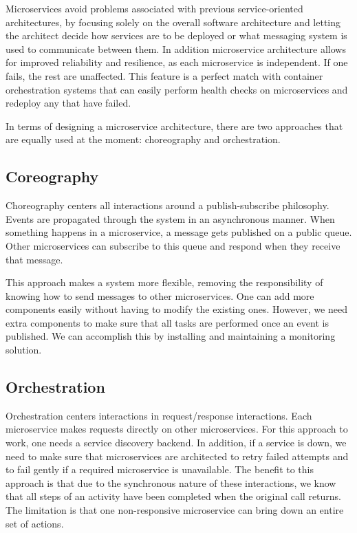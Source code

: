 Microservices avoid problems associated with previous service-oriented architectures, by focusing solely on the overall software architecture and letting the architect decide how services are to be deployed or what messaging system is used to communicate between them. In addition microservice architecture allows for improved reliability and resilience, as each microservice is independent. If one fails, the rest are unaffected. This feature is a perfect match with container orchestration systems that can easily perform health checks on microservices and redeploy any that have failed.

In terms of designing a microservice architecture, there are two approaches that are equally used at the moment: choreography and orchestration.\parencite{microservices}


\subsection{Coreography}

Choreography centers all interactions around a publish-subscribe philosophy. Events are propagated through the system in an asynchronous manner. When something happens in a microservice, a message gets published on a public queue. Other microservices can subscribe to this queue and respond when they receive that message.

This approach makes a system more flexible, removing the responsibility of knowing how to send messages to other microservices. One can add more components easily without having to modify the existing ones. However, we need extra components to make sure that all tasks are performed once an event is published. We can accomplish this by installing and maintaining a monitoring solution.



\subsection{Orchestration}

Orchestration centers interactions in request/response interactions. Each microservice makes requests directly on other microservices. For this approach to work, one needs a service discovery backend. In addition, if a service is down, we need to make sure that microservices are architected to retry failed attempts and to fail gently if a required microservice is unavailable. The benefit to this approach is that due to the synchronous nature of these interactions, we know that all steps of an activity have been completed when the original call returns. The limitation is that one non-responsive microservice can bring down an entire set of actions.

